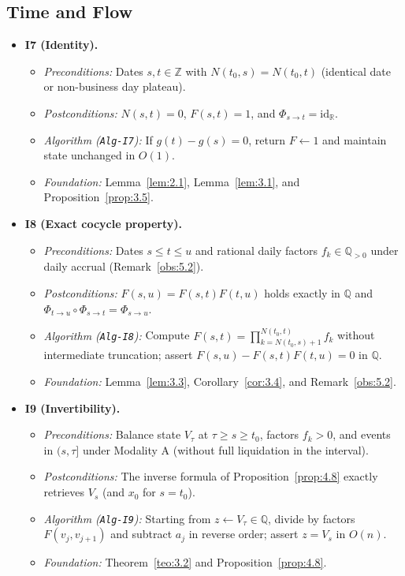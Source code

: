 \documentclass[11pt, a4paper]{article}
\theoremstyle{definition}
\theoremstyle{plain}
\theoremstyle{remark}
\begin{document}
\subsection{Time and Flow}

\begin{itemize}
    \item \textbf{I7 (Identity).}
    \begin{itemize}
        \item \emph{Preconditions:} Dates $s, t \in \mathbb{Z}$ with $N(t_0, s) = N(t_0, t)$ (identical date or non-business day plateau).
        \item \emph{Postconditions:} $N(s,t) = 0$, $F(s,t) = 1$, and $\Phi_{s \to t} = \mathrm{id}_{\mathbb{R}}$.
        \item \emph{Algorithm (\texttt{Alg-I7}):} If $g(t) - g(s) = 0$, return $F \leftarrow 1$ and maintain state unchanged in $O(1)$.
        \item \emph{Foundation:} Lemma~\ref{lem:2.1}, Lemma~\ref{lem:3.1}, and Proposition~\ref{prop:3.5}.
    \end{itemize}

    \item \textbf{I8 (Exact cocycle property).}
    \begin{itemize}
        \item \emph{Preconditions:} Dates $s \le t \le u$ and rational daily factors $f_k \in \mathbb{Q}_{>0}$ under daily accrual (Remark~\ref{obs:5.2}).
        \item \emph{Postconditions:} $F(s,u) = F(s,t)F(t,u)$ holds exactly in $\mathbb{Q}$ and $\Phi_{t \to u} \circ \Phi_{s \to t} = \Phi_{s \to u}$.
        \item \emph{Algorithm (\texttt{Alg-I8}):} Compute $F(s,t) = \prod_{k=N(t_0,s)+1}^{N(t_0,t)} f_k$ without intermediate truncation; assert $F(s,u) - F(s,t)F(t,u) = 0$ in $\mathbb{Q}$.
        \item \emph{Foundation:} Lemma~\ref{lem:3.3}, Corollary~\ref{cor:3.4}, and Remark~\ref{obs:5.2}.
    \end{itemize}

    \item \textbf{I9 (Invertibility).}
    \begin{itemize}
        \item \emph{Preconditions:} Balance state $V_\tau$ at $\tau \ge s \ge t_0$, factors $f_k > 0$, and events in $(s, \tau]$ under Modality A (without full liquidation in the interval).
        \item \emph{Postconditions:} The inverse formula of Proposition~\ref{prop:4.8} exactly retrieves $V_s$ (and $x_0$ for $s = t_0$).
        \item \emph{Algorithm (\texttt{Alg-I9}):} Starting from $z \leftarrow V_\tau \in \mathbb{Q}$, divide by factors $F(v_j, v_{j+1})$ and subtract $a_j$ in reverse order; assert $z = V_s$ in $O(n)$.
        \item \emph{Foundation:} Theorem~\ref{teo:3.2} and Proposition~\ref{prop:4.8}.
    \end{itemize}


\end{itemize}
\end{document}
